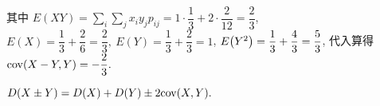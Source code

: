 \begin{solution}
\begin{minipage}{0.69\linewidth}
\begin{enumerate}[label=(\arabic{*})]
                  其中 $\displaystyle E(XY)=\sum_i\sum_j x_iy_jp_{ij}=1\cdot\dfrac{1}{3}+2\cdot\dfrac{2}{12}=\dfrac{2}{3}$, 
                  $E(X)=\dfrac{1}{3}+\dfrac{2}{6}=\dfrac{2}{3},~E(Y)=\dfrac{1}{3}+\dfrac{2}{3}=1$, 
                  $E\qty(Y^2)=\dfrac{1}{3}+\dfrac{4}{3}=\dfrac{5}{3}$, 代入算得 $\mathrm{cov}(X-Y,Y)=-\dfrac{2}{3}.$
        \end{enumerate}
    \end{minipage}
\end{solution}

\begin{theorem}[协方差与方差]
    $D(X\pm Y)=D(X)+D(Y)\pm 2\mathrm{cov}(X,Y).$
\end{theorem}


